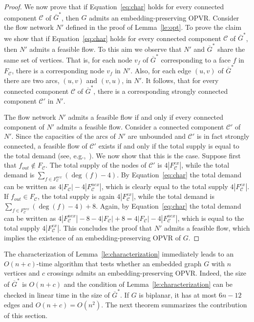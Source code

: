 \documentclass{article}
\newcommand{\C}{\mathcal C}
\newcommand{\opvr}{OPVR\xspace}
\newcommand{\bG}{\overline{G}}
\begin{document}
\begin{proof}
We now prove that if Equation~\ref{eq:char} holds for every connected component $\C$ of $\bG^*$, then $G$ admits an embedding-preserving \opvr. Consider the flow network $N'$ defined in the proof of Lemma~\ref{le:opt}. To prove the claim we show that if  Equation~\ref{eq:char} holds for every connected component $\C$ of $\bG^*$, then $N'$ admits a feasible flow. To this aim we observe that $N'$ and $\bG^*$ share the same set of vertices. That is, for each node $v_f$ of $\bG^*$ corresponding to a face $f$ in $F_{\C}$, there is a corresponding node $v_f$ in $N'$. Also, for each edge $(u,v)$ of $\bG^*$ there are two arcs, $(u,v)$ and $(v,u)$, in $N'$. It follows, that for every connected component $\C$ of $\bG^*$, there is a corresponding strongly connected component $\C'$ in $N'$.

The flow network $N'$ admits a feasible flow if and only if every connected component of $N'$ admits a feasible flow. Consider a connected component $\C'$ of $N'$. Since the capacities of the arcs of $N'$ are unbounded and $\C'$ is in fact strongly connected, a feasible flow of $\C'$ exists if and only if the total supply is equal to the total demand (see, e.g.,~\cite{ht-fffscn-08}). We now show that this is the case. Suppose first that $f_{out} \not \in F_\C$. The total supply of the nodes of $\C'$ is $4 |F_\C^{ex}|$, while the total demand is $\sum_{f \in F_{\C}^{nex}}(\deg(f)-4)$. By Equation~\ref{eq:char} the total demand can be written as $4|F_{\C}|-4|F_{\C}^{nex}|$, which is clearly equal to the total supply $4 |F_\C^{ex}|$. If $f_{out} \in F_\C$, the total supply is again $4 |F_\C^{ex}|$, while the total demand is $\sum_{f \in F_{\C}^{nex}}(\deg(f)-4)+8$. Again, by Equation~\ref{eq:char} the total demand can be written as $4|F_\C^{nex}|-8-4|F_{\C}|+8=4|F_{\C}|-4|F_{\C}^{nex}|$, which is equal to the total supply $4 |F_\C^{ex}|$. This concludes the proof that $N'$ admits a feasible flow, which implies the existence of an embedding-preserving \opvr of $G$.
\end{proof}


The characterization of Lemma~\ref{le:characterization} immediately leads to an $O(n+c)$-time algorithm that tests whether an embedded graph $G$ with $n$ vertices and $c$ crossings admits an embedding-preserving \opvr. Indeed, the size of $\bG^*$ is $O(n+c)$ and the condition of Lemma~\ref{le:characterization} can be checked in linear time in the size of $\bG^*$. If $G$ is biplanar, it has at most $6n-12$ edges and $O(n+c) = O(n^2)$.
The next theorem summarizes the contribution of this section.
\end{document}
